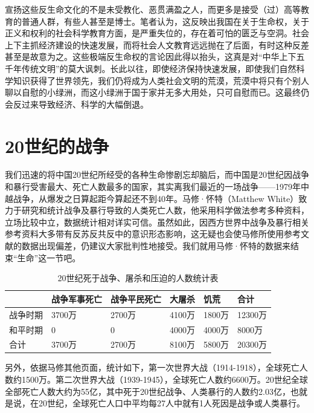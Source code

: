 宣扬这些反生命文化的不是未受教化、恶贯满盈之人，而更多是接受（过）高等教育的普通人群，有些人甚至是博士。笔者认为，这反映出我国在关于生命权，关于正义和权利的社会科学教育方面，是严重失位的，存在着可怕的匮乏与空洞。社会上下主抓经济建设的快速发展，而将社会人文教育远远抛在了后面，有时这种反差甚至是故意为之。这些极端反生命权的言论因此得以抬头，这真是对“中华上下五千年传统文明”的莫大讽刺。长此以往，即使经济保持快速发展，即使我们自然科学知识获得了世界领先，我们仍将成为人类社会文明的荒漠，荒漠中将只有个别人聊以自慰的小绿洲，而这小绿洲于国于家并无多大用处，只可自慰而已。这最终仍会反过来导致经济、科学的大幅倒退。

\section{20世纪的战争}

我们迅速的将中国20世纪所经受的各种生命惨剧忘却脑后，而中国是20世纪因战争和暴行受害最大、死亡人数最多的国家，其实离我们最近的一场战争——1979年中越战争，从爆发之日算起距今算起还不到40年。马修·怀特（Matthew White）\cite{mattwhite}致力于研究和统计战争及暴行导致的人类死亡人数，他采用科学做法参考多种资料，立场比较中立，数据统计相对详实可信。虽然如此，因西方世界中战争及暴行相关参考资料大多带有反苏反共反中的意识形态影响，这无疑也会使马修所使用参考文献的数据出现偏差，仍建议大家批判性地接受。我们就用马修·怀特的数据来结束“生命”这一节吧。

\begin{table}[h] \centering
  \caption{20世纪死于战争、屠杀和压迫的人数统计表}
  \label{20stdied} \medskip
  \begin{tabular}{@{}llllll@{}}
    \toprule & 战争军事死亡 & 战争平民死亡 & 大屠杀 & 饥荒 & 合计 \\ \midrule
    战争时期 & 3700万 & 2700万 & 4100万 & 1800万 & 12300万 \\
    和平时期 & 0 & 0 & 4000万 & 4000万 & 8000万 \\
    合计 & 3700万 & 2700万 & 8100万 & 5800万 & 20300万 \\ \bottomrule
  \end{tabular}
\end{table}

另外，依据马修其他页面，统计如下，第一次世界大战（1914-1918），全球死亡人数约1500万。第二次世界大战（1939-1945），全球死亡人数约6600万。20世纪全球全部死亡人数大约为55亿，其中死于20世纪战争、人类暴行的人数约2.03亿，也就是说，在20世纪，全球死亡人口中平均每27人中就有1人死因是战争或人类暴行。

